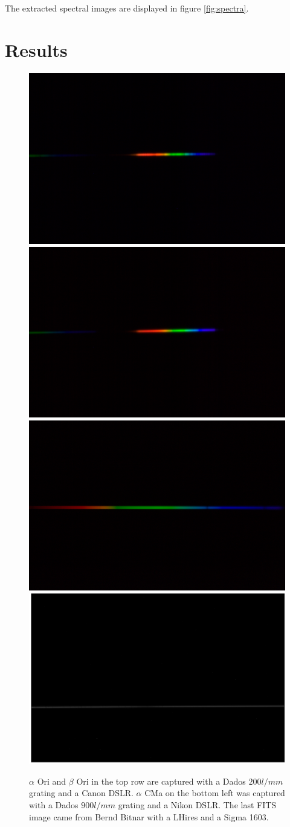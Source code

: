 \documentclass[10pt,a4paper,notitlepage]{article}
\begin{document}
		The extracted spectral images are displayed in figure \ref{fig:spectra}.
		
\section{Results}

	\begin{figure}[h]
		\includegraphics[width=0.49\columnwidth]{img/alpori.png}
		\includegraphics[width=0.49\columnwidth]{img/betori.png} \\
		\includegraphics[width=0.49\columnwidth]{img/alpcma.png}
		\includegraphics[width=0.49\columnwidth]{img/alpleo.png}
		
		\caption[orig]%
		{$\alpha$ Ori and $\beta$ Ori in the top row are captured with a Dados $200 l/mm$ grating and a Canon DSLR.
		$\alpha$ CMa on the bottom left was captured with a Dados $900 l/mm$ grating and a Nikon DSLR.
		The last FITS image came from Bernd Bitnar with a LHires and a Sigma 1603.}
		\label{fig:orig}
	\end{figure}
	
\end{document}
